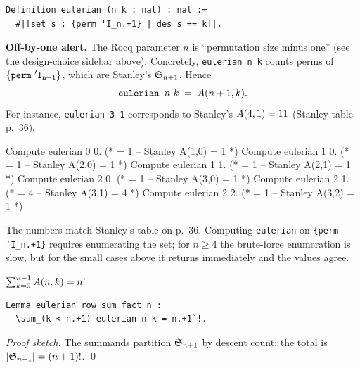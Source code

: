 \begin{lstlisting}[language=Rocq]
Definition eulerian (n k : nat) : nat :=
  #|[set s : {perm 'I_n.+1} | des s == k]|.
\end{lstlisting}


\noindent
\textbf{Off-by-one alert.} The Rocq parameter $n$ is ``permutation
size minus one'' (see the design-choice sidebar above). Concretely,
\texttt{eulerian n k} counts perms of $\mathtt{\{perm\ \mathtt{'I_{n+1}}\}}$, which are
Stanley's $\mathfrak{S}_{n+1}$. Hence
\[
  \texttt{eulerian } n\ k \;=\; A(n+1, k).
\]
For instance, \texttt{eulerian 3 1} corresponds to Stanley's
$A(4, 1) = 11$ (Stanley table p.~36).

\begin{computestrip}
Compute eulerian 0 0.    (* = 1     -- Stanley A(1,0) = 1 *)
Compute eulerian 1 0.    (* = 1     -- Stanley A(2,0) = 1 *)
Compute eulerian 1 1.    (* = 1     -- Stanley A(2,1) = 1 *)
Compute eulerian 2 0.    (* = 1     -- Stanley A(3,0) = 1 *)
Compute eulerian 2 1.    (* = 4     -- Stanley A(3,1) = 4 *)
Compute eulerian 2 2.    (* = 1     -- Stanley A(3,2) = 1 *)
\end{computestrip}

\noindent The numbers match Stanley's table on p.~36. Computing
\texttt{eulerian} on \texttt{\{perm 'I\_n.+1\}} requires enumerating
the set; for $n \geq 4$ the brute-force enumeration is slow, but
for the small cases above it returns immediately and the values
agree.

\begin{lemma}
  \label{lem:eulerian_row_sum}
  $\sum_{k=0}^{n-1} A(n, k) = n!$
\end{lemma}

\begin{lstlisting}[language=Rocq]
Lemma eulerian_row_sum_fact n :
  \sum_(k < n.+1) eulerian n k = n.+1`!.
\end{lstlisting}


\noindent
\emph{Proof sketch.} The summands partition $\mathfrak{S}_{n+1}$ by descent
count; the total is $|\mathfrak{S}_{n+1}| = (n+1)!$. \qed

